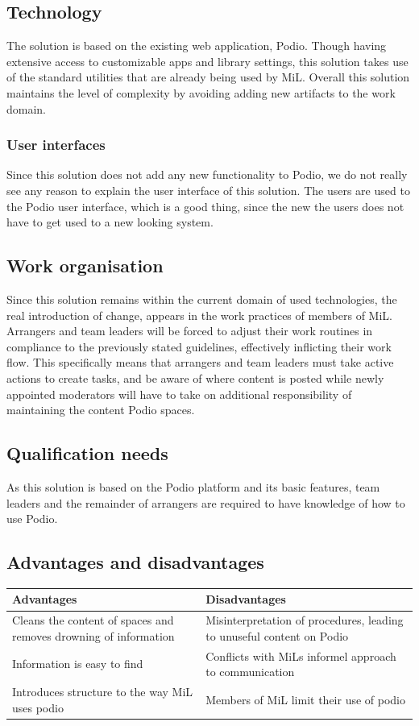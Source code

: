\subsection{Technology}
The solution is based on the existing web application, Podio. Though having extensive access to customizable apps and library settings, this solution takes use of the standard utilities that are already being used by MiL. Overall this solution maintains the level of complexity by avoiding adding new artifacts to the work domain.

\subsubsection{User interfaces}
Since this solution does not add any new functionality to Podio, we do not really see any reason to
explain the user interface of this solution. The users are used to the Podio user interface, which
is a good thing, since the new the users does not have to get used to a new looking system.

\subsection{Work organisation}
Since this solution remains within the current domain of used technologies, the real introduction of change, appears in the work practices of members of MiL. Arrangers and team leaders will be forced to adjust their work routines in compliance to the previously stated guidelines, effectively inflicting their work flow. 
This specifically means that arrangers and team leaders must take active actions to create tasks,
and be aware of where content is posted while newly appointed moderators will have to take on additional responsibility of maintaining the content Podio spaces.

\subsection{Qualification needs}
As this solution is based on the Podio platform and its basic features, team leaders and the
remainder of arrangers are required to have knowledge of how to use Podio. 

\subsection{Advantages and disadvantages}
\begin{center}
    \begin{tabular}{ | p{7cm} | p{7cm} |}
    \hline
    \textbf{Advantages} & \textbf{Disadvantages}  \\ \hline
    Cleans the content of spaces and removes drowning of information & Misinterpretation of procedures, leading to unuseful content on Podio  \\ \hline
    Information is easy to find & Conflicts with MiLs informel approach to communication \\
    \hline
    Introduces structure to the way MiL uses podio & Members of MiL limit their use of podio \\ \hline
    \end{tabular}
\end{center}

